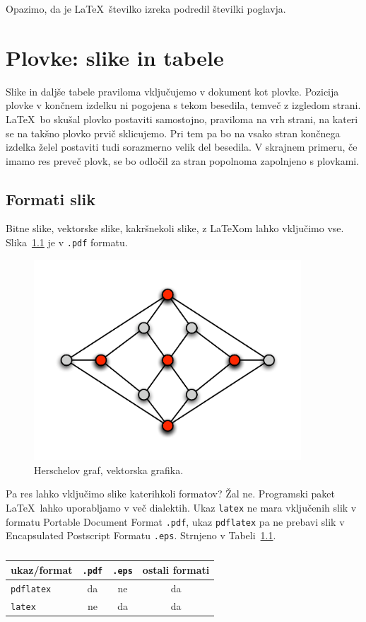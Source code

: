 \documentclass[oneside, a4paper, 12pt]{book}
\begin{document}
Opazimo, da je \LaTeX\ številko izreka podredil številki poglavja.


\chapter{Plovke: slike in tabele}
\label{ch2}
Slike in daljše tabele praviloma vključujemo v dokument kot plovke. Pozicija plovke v končnem izdelku ni pogojena s tekom besedila, temveč z izgledom strani. \LaTeX\ bo skušal plovko postaviti samostojno, praviloma na vrh strani, na kateri se na takšno plovko prvič sklicujemo. Pri tem pa bo na vsako stran končnega izdelka želel postaviti tudi sorazmerno velik del besedila. V skrajnem primeru, če imamo res preveč plovk, se bo odločil za stran popolnoma zapolnjeno s plovkami.

\section{Formati slik}
Bitne slike, vektorske slike, kakršnekoli slike, z \LaTeX{}om lahko vključimo vse. 
Slika~\ref{pic1} je v {\tt .pdf} formatu.
\begin{figure}
\begin{center}
\includegraphics[width=10cm]{pic1.pdf}
\end{center}
\caption{Herschelov graf, vektorska grafika.}
\label{pic1}
\end{figure}
Pa res lahko vključimo slike katerihkoli formatov? Žal ne. Programski paket \LaTeX\ lahko uporabljamo v več dialektih. Ukaz {\tt latex} ne mara vključenih slik v formatu Portable Document Format {\tt .pdf}, ukaz {\tt pdflatex} pa ne prebavi slik v Encapsulated Postscript Formatu {\tt .eps}. 
Strnjeno v Tabeli~\ref{tbl:1}.

\begin{table}
\begin{center}
\begin{tabular}{l|ccc}
ukaz/format & {\tt .pdf} & {\tt .eps} & ostali formati \\ \hline
{\tt pdflatex} & da & ne & da \\
{\tt latex}   & ne & da  & da
\end{tabular}
\end{center}
\caption{}
\label{tbl:1}
\end{table}
\end{document}
